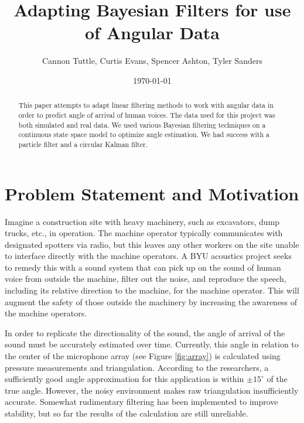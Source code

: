 \documentclass[11pt]{amsart}
\begin{document}
\title{Adapting Bayesian Filters for use of Angular Data}
\author{Cannon Tuttle, Curtis Evans, Spencer Ashton, Tyler Sanders}

\date{\today}

\begin{abstract}
    This paper attempts to adapt linear filtering methods to work with angular data in order to predict angle of arrival of human voices. The data used for this 
    project was both simulated and real data. We used various Bayesian filtering techniques on a continuous state space model to optimize angle estimation. We had
    success with a particle filter and a circular Kalman filter.
\end{abstract}

\maketitle

\section{Problem Statement and Motivation}
Imagine a construction site with heavy machinery, such as excavators, dump trucks, etc.,  in operation. The machine operator typically communicates with designated spotters via radio, but this leaves any other workers on the site unable to interface directly with the machine operators. A BYU acoustics project seeks to remedy this with a sound system that can pick up on the sound of human voice from outside the machine, filter out the noise, and reproduce the speech, including its relative direction to the machine, for the machine operator.  This will augment the safety of those outside the machinery by increasing the awareness of the machine operators.

In order to replicate the directionality of the sound, the angle of arrival of the sound must be accurately estimated over time. Currently, this angle in relation to the center of the microphone array (see Figure \ref{fig:array}) is calculated using pressure measurements and triangulation. According to the researchers, a sufficiently good angle approximation for this application is within $\pm15^{\circ}$ of the true angle. However, the noisy environment makes raw triangulation insufficiently accurate. Somewhat rudimentary filtering has been implemented to improve stability, but so far the results of the calculation are still unreliable.
\end{document}
